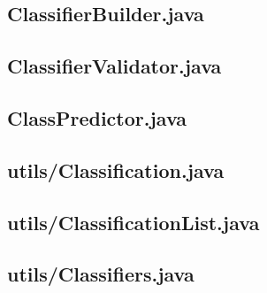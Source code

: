 \documentclass{article}
\begin{document}
\begin{appendices}
\begin{subappendices}
        \pagebreak
        \subsection{ClassifierBuilder.java}
        

        \pagebreak
        \subsection{ClassifierValidator.java}
        

        \pagebreak
        \subsection{ClassPredictor.java}
        

        \pagebreak
        \subsection{utils/Classification.java}
        

        \pagebreak
        \subsection{utils/ClassificationList.java}
        

        \pagebreak
        \subsection{utils/Classifiers.java}
        


\end{subappendices}
\end{appendices}
\end{document}
